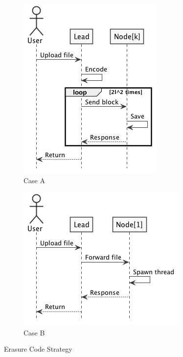 \begin{figure}[H]
    \centering
    \begin{subfigure}{.35\textwidth}
        \includegraphics[width=\textwidth]{figures/e3a.png}
        \caption{Case A}
    \end{subfigure}
    \hspace{30px}
    \begin{subfigure}{.42\textwidth}
        \includegraphics[width=\textwidth]{figures/e3b.png}
        \caption{Case B}
    \end{subfigure}
    \caption{Erasure Code Strategy}
    \label{fig:ecs}
\end{figure}

